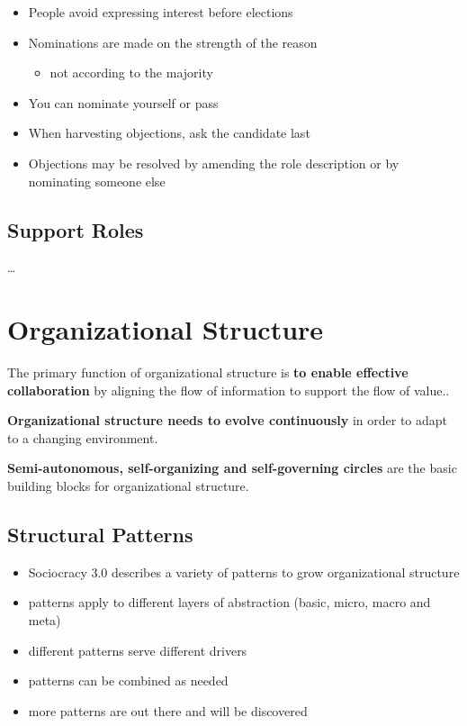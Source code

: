 \begin{itemize}
\item People avoid expressing interest before elections

\item Nominations are made on the strength of the reason

\begin{itemize}
\item not according to the majority

\end{itemize}

\item You can nominate yourself or pass

\item When harvesting objections, ask the candidate last

\item Objections may be resolved by amending the role description or by nominating someone else

\end{itemize}

\section{Support Roles}
\label{supportroles}

{\ldots}

\chapter{Organizational Structure}
\label{organizationalstructure}

The primary function of organizational structure is \textbf{to enable effective collaboration} by aligning the flow of information to support the flow of value..

\textbf{Organizational structure needs to evolve continuously} in order to adapt to a changing environment.

\textbf{Semi-autonomous, self-organizing and self-governing circles} are the basic building blocks for organizational structure.

\section{Structural Patterns}
\label{structuralpatterns}

\begin{itemize}
\item Sociocracy 3.0 describes a variety of patterns to grow organizational structure

\item patterns apply to different layers of abstraction (basic, micro, macro and meta)

\item different patterns serve different drivers

\item patterns can be combined as needed

\item more patterns are out there and will be discovered

\end{itemize}

